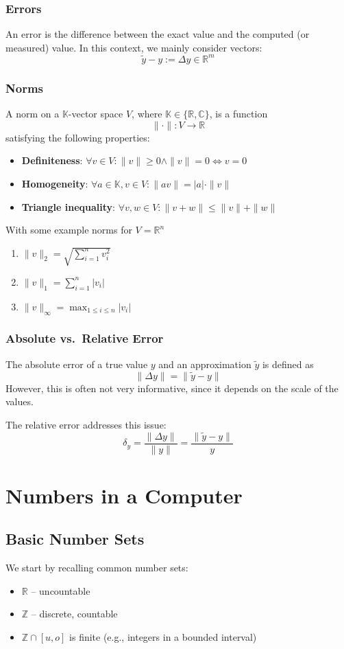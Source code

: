 \documentclass{article}
\begin{document}
\subsubsection{Errors}
An error is the difference between the exact value and the computed (or measured) value. In this context, we mainly consider vectors:
\[
\tilde{y} - y := \Delta y \in \mathbb{R}^m
\]

\subsubsection{Norms}
A norm on a $\mathbb{K}$-vector space $V$, where $\mathbb{K} \in \{\mathbb{R}, \mathbb{C}\}$, is a function
\[
\|\cdot\| : V \to \mathbb{R}
\]
satisfying the following properties:
\begin{itemize}
  \item \textbf{Definiteness}: $\forall v \in V : \|v\| \geq 0 \land \|v\| = 0 \Leftrightarrow v = 0$
  \item \textbf{Homogeneity}: $\forall a \in \mathbb{K}, v \in V : \|av\| = |a| \cdot \|v\|$
  \item \textbf{Triangle inequality}: $\forall v,w \in V : \|v+w\| \leq \|v\| + \|w\|$
\end{itemize}
With some example norms for $V= \mathbb{R}^n$
\begin{enumerate}
  \item $\|v\|_2 = \sqrt{\sum_{i=1}^n v_i^2}$
  \item $\|v\|_1 = \sum_{i=1}^n |v_i|$
  \item $\|v\|_\infty = \max_{1\leq i \leq n}|v_i|$
\end{enumerate}
\subsubsection{Absolute vs.\ Relative Error}
The absolute error of a true value $y$ and an approximation $\tilde{y}$ is defined as
\[
\|\Delta y\| = \|\tilde{y} - y\|
\]
However, this is often not very informative, since it depends on the scale of the values.

The relative error addresses this issue:
\[
\delta_y = \frac{\|\Delta y\|}{\|y\|} = \frac{\|\tilde{y} - y\|}{y}
\]
\section{Numbers in a Computer}

\subsection{Basic Number Sets}
We start by recalling common number sets:
\begin{itemize}
  \item $\mathbb{R}$ -- uncountable
  \item $\mathbb{Z}$ -- discrete, countable
  \item $\mathbb{Z} \cap [u,o]$ is finite (e.g., integers in a bounded interval)
\end{itemize}
\end{document}
